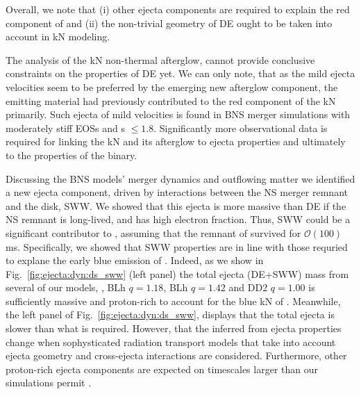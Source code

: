 Overall, we note that (i) other ejecta components are required to 
explain the red component of \AT{} and (ii) the non-trivial geometry of 
\ac{DE} ought to be taken into account in \ac{kN} modeling.


The analysis of the \ac{kN} non-thermal afterglow, cannot provide conclusive 
constraints on the properties of \ac{DE} yet. 
We can only note, that as the mild ejecta velocities seem to be preferred by the 
emerging new \GRB{} afterglow component, the emitting material had previously 
contributed to the red component of the \ac{kN} primarily. Such ejecta of 
mild velocities is found in \ac{BNS} merger simulations with moderately stiff 
\acp{EOS} and \mr{}s ${\leq}1.8$. 
%
Significantly more observational data is required for linking the \ac{kN} and 
its afterglow to ejecta properties and ultimately to the properties of the 
binary. 






Discussing the \ac{BNS} models' merger dynamics and outflowing matter we identified 
a new ejecta component, driven by interactions between the \ac{NS} merger 
remnant and the disk, \ac{SWW}. %
%
We showed that this ejecta is more massive than \ac{DE} if the \ac{NS} remnant 
is long-lived, and has high electron fraction. %
%
Thus, \ac{SWW} could be a significant contributor to \AT{}, assuming that 
the \pmerg{} remnant of \GW{} survived for $\mathcal{O}(100)\,$ms.
Specifically, we showed that \ac{SWW} properties are in line with 
those requried to explane the early blue emission of \AT{}. 
%
Indeed, as we show in Fig.~\ref{fig:ejecta:dyn:ds_sww} (left panel)
%
the total ejecta (\ac{DE}+\ac{SWW}) mass from several of our models, \eg, 
BLh $q=1.18$, BLh $q=1.42$ and DD2 $q=1.00$ 
is sufficiently massive and proton-rich to account for the blue 
\ac{kN} of \AT{}. Meanwhile, the left panel of Fig.~\ref{fig:ejecta:dyn:ds_sww}, 
displays that the total ejecta is slower than what is required. 
%
However, that the inferred from \AT{} ejecta properties change when sophysticated 
radiation transport models that take into account ejecta geometry and cross-ejecta 
interactions are considered. Furthermore, other proton-rich ejecta components are 
expected on timescales larger than our simulations permit 
\citep[\eg][]{Fujibayashi:2017puw,Fernandez:2018kax,Radice:2018xqa}.

